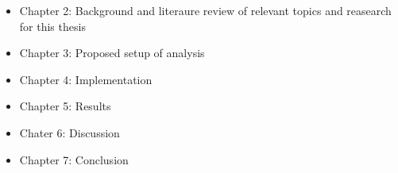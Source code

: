 \begin{itemize}
  \item Chapter 2: Background and literaure review of relevant topics and reasearch for this thesis
  \item Chapter 3: Proposed setup of analysis
  \item Chapter 4: Implementation
  \item Chapter 5: Results
  \item Chater 6: Discussion
  \item Chapter 7: Conclusion
\end{itemize}




